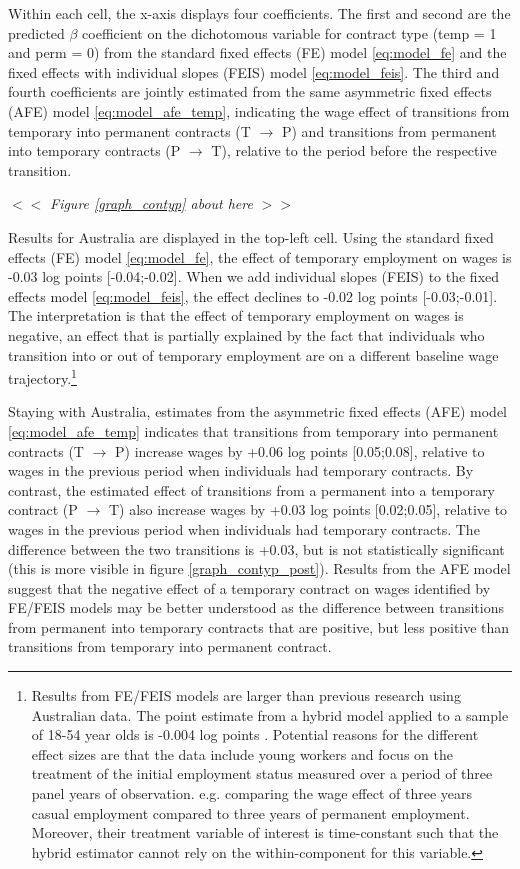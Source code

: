 \documentclass[12pt]{article}
\begin{document}
Within each cell, the x-axis displays four coefficients.  The first and second are the predicted $\beta$ coefficient on the dichotomous variable for contract type (temp = 1 and perm = 0) from the standard fixed effects (FE) model \ref{eq:model_fe} and the fixed effects with individual slopes (FEIS) model \ref{eq:model_feis}.  The third and fourth coefficients are jointly estimated from the same asymmetric fixed effects (AFE) model \ref{eq:model_afe_temp}, indicating the wage effect of transitions from temporary into permanent contracts (T $\rightarrow$ P) and transitions from permanent into temporary contracts (P $\rightarrow$ T), relative to the period before the respective transition. 

\begin{center}
$<<$ \emph{Figure \ref{graph_contyp} about here} $>>$
\end{center}

Results for Australia are displayed in the top-left cell.  Using the standard fixed effects (FE) model \ref{eq:model_fe}, the effect of temporary employment on wages is -0.03 log points [-0.04;-0.02].  When we add individual slopes (FEIS) to the fixed effects model \ref{eq:model_feis}, the effect declines to -0.02 log points [-0.03;-0.01].  The interpretation is that the effect of temporary employment on wages is negative, an effect that is partially explained by the fact that individuals who transition into or out of temporary employment are on a different baseline wage trajectory.\footnote{Results from FE/FEIS models are larger than previous research using Australian data.  The point estimate from a hybrid model applied to a sample of 18-54 year olds is -0.004 log points \citep{mooi-reci_casual_2017}.  Potential reasons for the different effect sizes are that the data include young workers and focus on the treatment of the initial employment status measured over a period of three panel years of observation. e.g. comparing the wage effect of three years casual employment compared to three years of permanent employment. Moreover, their treatment variable of interest is time-constant such that the hybrid estimator cannot rely on the within-component for this variable. }     

Staying with Australia, estimates from the asymmetric fixed effects (AFE) model \ref{eq:model_afe_temp} indicates that transitions from temporary into permanent contracts (T $\rightarrow$ P) increase wages by +0.06 log points [0.05;0.08], relative to wages in the previous period when individuals had temporary contracts.  By contrast, the estimated effect of transitions from a permanent into a temporary contract (P $\rightarrow$ T) also increase wages by +0.03 log points [0.02;0.05], relative to wages in the previous period when individuals had temporary contracts.  The difference between the two transitions is +0.03, but is not statistically significant (this is more visible in figure \ref{graph_contyp_post}).  Results from the AFE model suggest that the negative effect of a temporary contract on wages identified by FE/FEIS models may be better understood as the difference between transitions from permanent into temporary contracts that are positive, but less positive than transitions from temporary into permanent contract.  
\end{document}
